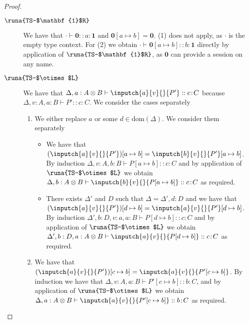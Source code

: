 \begin{lemma}
\begin{proof}
\begin{description}

\item[$\runa{TS-$\mathbf{1}$R}$] We have that $\cdot\vdash \mathbf{0} :: a\!:\!\mathbf{1}$ and $\mathbf{0}[a\mapsto b]=\mathbf{0}$. (1) does not apply, as $\cdot$ is the empty type context. For (2) we obtain $\cdot \vdash \mathbf{0}[a\mapsto b] :: b\!:\!\mathbf{1}$ directly by application of $\runa{TS-$\mathbf{1}$R}$, as $\mathbf{0}$ can provide a session on any name.

\item[$\runa{TS-$\otimes$L}$] We have that $\Delta,a:A\otimes B \vdash \inputch{a}{v}{}{P'} :: c\!:\!C$ because $\Delta,v:A,a:B\vdash P' :: c\!:\!C$. We consider the cases separately
\begin{enumerate}
    \item We either replace $a$ or some $d\in\text{dom}(\Delta)$. We consider them separately
    \begin{itemize}
        \item We have that $(\inputch{a}{v}{}{P'})[a\mapsto b]=\inputch{b}{v}{}{P'}[a\mapsto b]$. By induction $\Delta,v:A,b:B\vdash P[a\mapsto b] :: c\!:\!C$ and by application of $\runa{TS-$\otimes$L}$ we obtain $\Delta,b:A\otimes B\vdash \inputch{b}{v}{}{P[a\mapsto b]} :: c\!:\!C$ as required.
        
        \item There exists $\Delta'$ and $D$ such that $\Delta=\Delta',d:D$ and we have that $(\inputch{a}{v}{}{P'})[d\mapsto b]=\inputch{a}{v}{}{P'}[d\mapsto b]$. By induction $\Delta',b:D,v:a,a:B\vdash P[d\mapsto b] :: c\!:\!C$ and by application of $\runa{TS-$\otimes$L}$ we obtain $\Delta',b:D,a:A\otimes B\vdash \inputch{a}{v}{}{P[d\mapsto b]} :: c\!:\!C$ as required. 
    \end{itemize}
    
    \item We have that $(\inputch{a}{v}{}{P'})[c\mapsto b]=\inputch{a}{v}{}{P'[c\mapsto b]}$. By induction we have that $\Delta,v:A,a:B\vdash P'[c\mapsto b] :: b\!:\!C$, and by application of $\runa{TS-$\otimes$L}$ we obtain $\Delta,a:A\otimes B \vdash \inputch{a}{v}{}{P'[c\mapsto b]} :: b\!:\!C$ as required.
\end{enumerate}


\end{description}
\end{proof}
\end{lemma}
